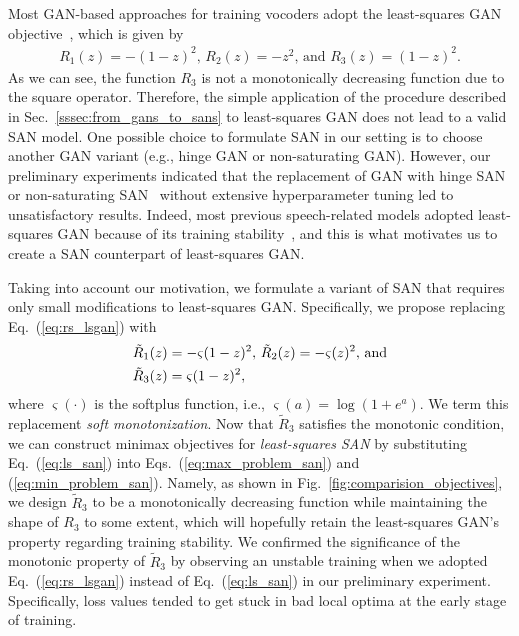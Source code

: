 \documentclass{article}
\def\beqref#1{(\ref{#1})}
\begin{document}
Most GAN-based approaches for training vocoders adopt the least-squares GAN objective~\cite{mao2017least}, which is given by
\begin{align}
    R_1(z)=-(1-z)^2\text{, }R_2(z)=-z^2\text{, and } R_3(z)=(1-z)^2.
    \label{eq:rs_lsgan}
\end{align}
As we can see, the function $R_3$ is not a monotonically decreasing function due to the square operator. Therefore, the simple application of the procedure described in Sec.~\ref{sssec:from_gans_to_sans} to least-squares GAN does not lead to a valid SAN model. One possible choice to formulate SAN in our setting is to choose another GAN variant (e.g., hinge GAN or non-saturating GAN). However, our preliminary experiments indicated that the replacement of GAN with hinge SAN or non-saturating SAN~\cite{takida2023san} without extensive hyperparameter tuning led to unsatisfactory results. Indeed, most previous speech-related models adopted least-squares GAN because of its training stability~\cite{bollepalli2017generative,pascual17segan,yamamoto2020parallel,kong2020hifigan}, and this is what motivates us to create a SAN counterpart of least-squares GAN.

Taking into account our motivation, we formulate a variant of SAN that requires only small modifications to least-squares GAN. Specifically, we propose replacing Eq.~\beqref{eq:rs_lsgan} with
\begin{align}
    &\tilde{R}_1(z)=-\varsigma(1-z)^2\text{, }\tilde{R}_2(z)=-\varsigma(z)^2\text{, and}\notag\\
    &\tilde{R}_3(z)=\varsigma(1-z)^2,
    \label{eq:ls_san}
\end{align}
where $\varsigma(\cdot)$ is the softplus function, i.e., $\varsigma(a)=\log(1+e^a)$. We term this replacement \textit{soft monotonization}. Now that $\tilde{R}_3$ satisfies the monotonic condition, we can construct minimax objectives for \textit{least-squares SAN} by substituting Eq.~\beqref{eq:ls_san} into Eqs.~\beqref{eq:max_problem_san} and \beqref{eq:min_problem_san}. Namely, as shown in Fig.~\ref{fig:comparision_objectives}, we design $\tilde{R}_3$ to be a monotonically decreasing function while maintaining the shape of $R_3$ to some extent, which will hopefully retain the least-squares GAN's property regarding training stability. We confirmed the significance of the monotonic property of $\tilde{R}_3$ by observing an unstable training when we adopted Eq.~\beqref{eq:rs_lsgan} instead of Eq.~\beqref{eq:ls_san} in our preliminary experiment. Specifically, loss values tended to get stuck in bad local optima at the early stage of training.
\end{document}
